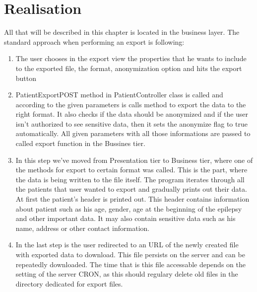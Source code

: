 \documentclass[thesis=B,english]{FITthesis}[2012/10/20]
\begin{document}
\chapter{Realisation}
All that will be described in this chapter is located in the business layer. The standard approach when performing an export is following:
\begin{enumerate}
\item{ The user chooses in the export view the properties that he wants to include to the exported file, the format, anonymization option and hits the export button }
\item{ PatientExportPOST method in PatientController class is called and according to the given parameters is calls method to export the data to the right format. It also checks if the data should be anonymized and if the user isn't authorized to see sensitive data, then it sets the anonymize flag to true automatically. All given parameters with all those informations are passed to called export function in the Bussines tier.}
\item{ In this step we've moved from Presentation tier to Business tier, where one of the methods for export to certain format was called. This is the part, where the data is being written to the file itself. The program iterates through all the patients that user wanted to export and gradually prints out their data.}
At first the patient's header is printed out. This header contains information about patient such as his age, gender, age at the beginning of the epilepsy and other important data. It may also contain sensitive data such as his name, address or other contact information.
\item{ In the last step is the user redirected to an URL of the newly created file with exported data to download. This file persists on the server and can be repeatedly downloaded. The time that is this file accessable depends on the setting of the server CRON, as this should regulary delete old files in the directory dedicated for export files.}

\end{enumerate}
\end{document}
